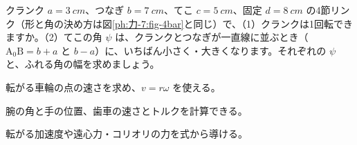 \bkproblem クランク $a=\qty{3}{cm}$、つなぎ $b=\qty{7}{cm}$、てこ $c=\qty{5}{cm}$、固定 $d=\qty{8}{cm}$ の4節リンク（形と角の決め方は図\ref{ph:力-7:fig-4bar}と同じ）で、（1）クランクは1回転できますか。（2）てこの角 $\psi$ は、クランクとつなぎが一直線に並ぶとき（$\mathrm{A_0B}=b+a$ と $b-a$）に、いちばん小さく・大きくなります。それぞれの $\psi$ と、ふれる角の幅を求めましょう。

\begin{furikaeri}
\begin{checklist}
\item 転がる車輪の点の速さを求め、$v=r\omega$ を使える。
\item 腕の角と手の位置、歯車の速さとトルクを計算できる。
\item 転がる加速度や遠心力・コリオリの力を式から導ける。
\end{checklist}
\end{furikaeri}
